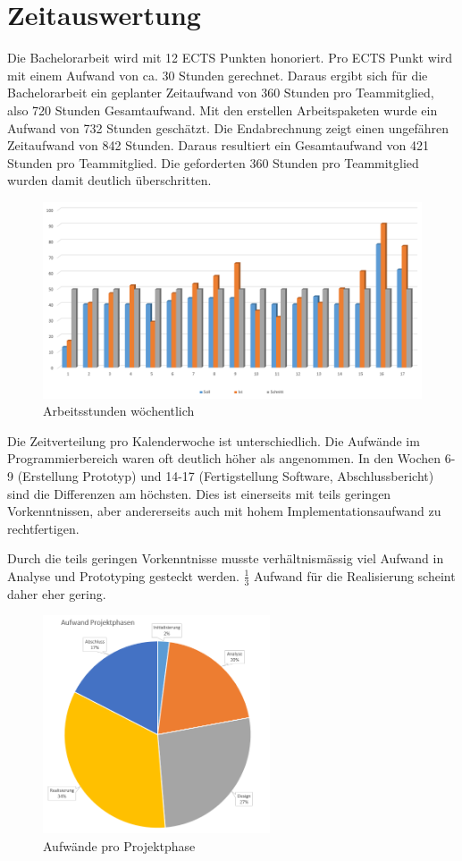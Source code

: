 \chapter{Zeitauswertung}
Die Bachelorarbeit wird mit 12 ECTS Punkten honoriert. Pro ECTS Punkt wird mit einem Aufwand von ca. 30 Stunden gerechnet. Daraus ergibt sich für die Bachelorarbeit ein geplanter Zeitaufwand von 360 Stunden pro Teammitglied, also 720 Stunden Gesamtaufwand. Mit den erstellen Arbeitspaketen wurde ein Aufwand von 732 Stunden
geschätzt. Die Endabrechnung zeigt einen ungefähren Zeitaufwand von 842 Stunden. Daraus resultiert ein Gesamtaufwand von 421 Stunden pro Teammitglied. Die geforderten 360 Stunden pro Teammitglied wurden damit deutlich überschritten.

\begin{figure}[H]
\centering
\includegraphics[width=1\textwidth]{../01_Projektplanung/images/weekly_done.png}
\caption{Arbeitsstunden wöchentlich}
\end{figure}

Die Zeitverteilung pro Kalenderwoche ist unterschiedlich. Die Aufwände im Programmierbereich waren oft deutlich höher als angenommen. In den Wochen 6-9 (Erstellung Prototyp) und 14-17 (Fertigstellung Software, Abschlussbericht) sind die Differenzen am höchsten. Dies ist einerseits mit teils geringen Vorkenntnissen, aber andererseits auch mit hohem Implementationsaufwand zu rechtfertigen. 

\newpage

Durch die teils geringen Vorkenntnisse musste verhältnismässig viel Aufwand in Analyse und Prototyping gesteckt werden. $\frac{1}{3}$ Aufwand für die Realisierung scheint daher eher gering.

\begin{figure}[H]
\centering
\includegraphics[width=0.6\textwidth]{../01_Projektplanung/images/aufwand_phasen.png}
\caption{Aufwände pro Projektphase}
\end{figure}

